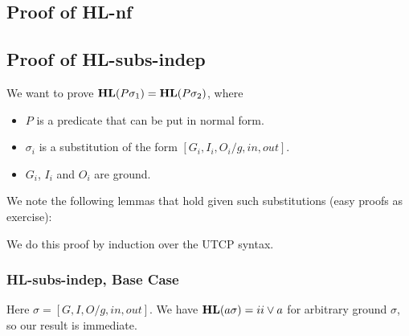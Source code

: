 \subsection{Proof of \textsf{HL-nf}}



\subsection{Proof of \textsf{HL-subs-indep}}

We want to prove $\mathbf{HL}(P\sigma_1)=\mathbf{HL}(P\sigma_2)$, where
\begin{itemize}
  \item $P$ is a predicate that can be put in normal form.
  \item $\sigma_i$ is a substitution of the form $[G_i,I_i,O_i/g,in,out]$.
  \item $G_i$, $I_i$ and $O_i$ are ground.
\end{itemize}
We note the following lemmas that hold given such substitutions
(easy proofs as exercise):

We do this proof by induction over the UTCP syntax.

\subsubsection{\textsf{HL-subs-indep}, Base Case}

Here $\sigma=[G,I,O/g,in,out]$.
We have $\mathbf{HL}(a\sigma) = ii \lor a$ for arbitrary ground $\sigma$,
so our result is immediate.

